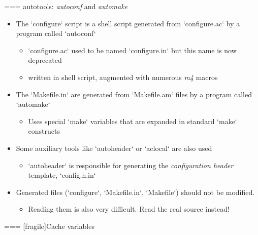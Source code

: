 === {autotools: {\em autoconf} and {\em automake}}
  \begin{itemize}
  \item The `configure` script is a shell script generated from
    `configure.ac` by a program called `autoconf`
    \begin{itemize}
    \item `configure.ac` used to be named `configure.in` but
      this name is now deprecated
    \item written in shell script, augmented with numerous {\em m4}
      macros
    \end{itemize}
  \item The `Makefile.in` are generated from `Makefile.am`
    files by a program called `automake`
    \begin{itemize}
    \item Uses special `make` variables that are expanded in
      standard `make` constructs
    \end{itemize}
  \item Some auxiliary tools like `autoheader` or `aclocal`
    are also used
    \begin{itemize}
    \item `autoheader` is responsible for generating the {\em
        configuration header} template, `config.h.in`
    \end{itemize}
  \item Generated files (`configure`, `Makefile.in`,
    `Makefile`) should not be modified.
    \begin{itemize}
    \item Reading them is also very difficult. Read the real source
      instead!
    \end{itemize}
  \end{itemize}


=== [fragile]{Cache variables}

